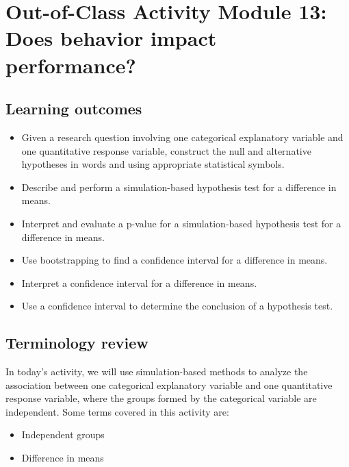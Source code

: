 \documentclass[
]{report}
\begin{document}
\newpage

\hypertarget{out-of-class-activity-module-13-does-behavior-impact-performance}{%
\section{Out-of-Class Activity Module 13: Does behavior impact performance?}\label{out-of-class-activity-module-13-does-behavior-impact-performance}}


\hypertarget{learning-outcomes-25}{%
\subsection{Learning outcomes}\label{learning-outcomes-25}}

\begin{itemize}
\item
  Given a research question involving one categorical explanatory variable and one quantitative response variable, construct the null and alternative hypotheses
  in words and using appropriate statistical symbols.
\item
  Describe and perform a simulation-based hypothesis test for a difference in means.
\item
  Interpret and evaluate a p-value for a simulation-based hypothesis test for a difference in means.
\item
  Use bootstrapping to find a confidence interval for a difference in means.
\item
  Interpret a confidence interval for a difference in means.
\item
  Use a confidence interval to determine the conclusion of a hypothesis test.
\end{itemize}

\hypertarget{terminology-review-21}{%
\subsection{Terminology review}\label{terminology-review-21}}

In today's activity, we will use simulation-based methods to analyze the association between one categorical explanatory variable and one quantitative response variable, where the groups formed by the categorical variable are independent. Some terms covered in this activity are:

\begin{itemize}
\item
  Independent groups
\item
  Difference in means
\end{itemize}
\end{document}

